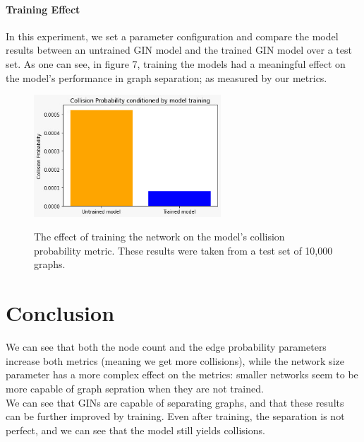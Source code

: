 \documentclass{article}
\begin{document}
\subsection*{Training Effect}
In this experiment, we set a parameter configuration and compare the model results between an untrained GIN model
and the trained GIN model over a test set.
As one can see, in figure 7, training the models had a
meaningful effect on the model's performance in graph separation; as measured by our metrics.
\begin{figure}
    \begin{center}
        \includegraphics[width=7cm]{../figures/Training_Performance_Bars.png}\\
        \caption{The effect of training the network on the model's collision probability metric.
        These results were taken from a test set of 10,000 graphs.}
    \end{center}
\end{figure}    


\part*{Conclusion}
We can see that both the node count and the edge probability parameters increase both metrics (meaning we get more collisions),
while the network size parameter has a more complex effect on the metrics: smaller networks seem to be more capable of graph sepration
when they are not trained.\\
We can see that GINs are capable of separating graphs, and that these results can be further improved by training.
Even after training, the separation is not perfect, and we can see that the model still yields collisions.
\end{document}
